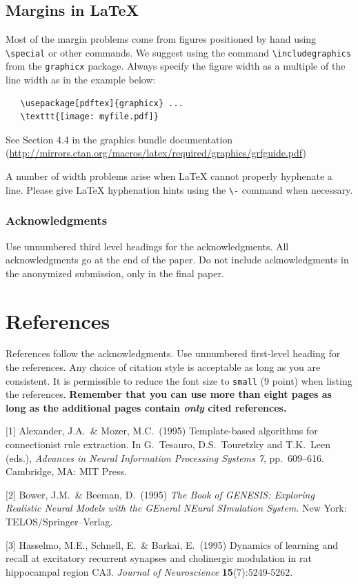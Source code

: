 \documentclass{article}
\begin{document}
\subsection{Margins in \LaTeX{}}

Most of the margin problems come from figures positioned by hand using
\verb+\special+ or other commands. We suggest using the command
\verb+\includegraphics+ from the \verb+graphicx+ package. Always
specify the figure width as a multiple of the line width as in the
example below:
\begin{verbatim}
   \usepackage[pdftex]{graphicx} ...
   \texttt{[image: myfile.pdf]}
\end{verbatim}
See Section 4.4 in the graphics bundle documentation
(\url{http://mirrors.ctan.org/macros/latex/required/graphics/grfguide.pdf})

A number of width problems arise when \LaTeX{} cannot properly
hyphenate a line. Please give LaTeX hyphenation hints using the
\verb+\-+ command when necessary.

\subsubsection*{Acknowledgments}

Use unnumbered third level headings for the acknowledgments. All
acknowledgments go at the end of the paper. Do not include
acknowledgments in the anonymized submission, only in the final paper.

\section*{References}




References follow the acknowledgments. Use unnumbered first-level
heading for the references. Any choice of citation style is acceptable
as long as you are consistent. It is permissible to reduce the font
size to \verb+small+ (9 point) when listing the references. {\bf
  Remember that you can use more than eight pages as long as the
  additional pages contain \emph{only} cited references.}
\medskip

\small

[1] Alexander, J.A.\ \& Mozer, M.C.\ (1995) Template-based algorithms
for connectionist rule extraction. In G.\ Tesauro, D.S.\ Touretzky and
T.K.\ Leen (eds.), {\it Advances in Neural Information Processing
  Systems 7}, pp.\ 609--616. Cambridge, MA: MIT Press.

[2] Bower, J.M.\ \& Beeman, D.\ (1995) {\it The Book of GENESIS:
  Exploring Realistic Neural Models with the GEneral NEural SImulation
  System.}  New York: TELOS/Springer--Verlag.

[3] Hasselmo, M.E., Schnell, E.\ \& Barkai, E.\ (1995) Dynamics of
learning and recall at excitatory recurrent synapses and cholinergic
modulation in rat hippocampal region CA3. {\it Journal of
  Neuroscience} {\bf 15}(7):5249-5262.
\end{document}
